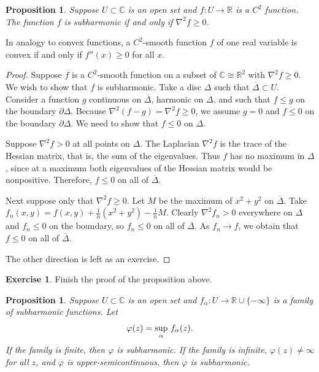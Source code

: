 \documentclass[12pt,openany]{book}
\newcommand{\avoidbreak}{\postdisplaypenalty=100}
\newcommand{\C}{{\mathbb{C}}}
\newcommand{\R}{{\mathbb{R}}}
\theoremstyle{plain}
\newtheorem{prop}[thm]{Proposition}
\theoremstyle{remark}
\theoremstyle{definition}
\newenvironment{exbox}{%
    \def\FrameCommand{\vrule width 1pt \relax\hspace{10pt}}%
    \MakeFramed{\advance\hsize-\width\FrameRestore}%
}{%
    \endMakeFramed
}
\theoremstyle{exercise}
\newtheorem{exercise}{Exercise}[section]
\theoremstyle{example}
\begin{document}
\begin{prop}
Suppose $U \subset \C$ is an open set and $f \colon U \to \R$ is a $C^2$ function.
The function $f$ is subharmonic if and only if
$\nabla^2 f \geq 0$.
\end{prop}

In analogy to convex functions, a $C^2$-smooth function $f$ of one
real variable is convex if and only if $f''(x) \geq 0$ for all $x$.

\begin{proof}
Suppose $f$ is a $C^2$-smooth function on a subset of $\C \cong \R^2$
with $\nabla^2 f \geq 0$.  We wish to show that $f$ is subharmonic.
Take a disc $\Delta$ such that $\overline{\Delta} \subset U$.
Consider a function
$g$ continuous on $\overline{\Delta}$,
harmonic on $\Delta$, and such that
$f \leq g$ on the boundary $\partial \Delta$.  Because
$\nabla^2 (f-g) = \nabla^2 f \geq 0$, we assume $g = 0$ and $f \leq 0$
on the boundary $\partial \Delta$.
We need to show that $f \leq 0$ on $\Delta$.

Suppose $\nabla^2 f > 0$ at all points on $\Delta$.
The Laplacian $\nabla^2 f$ is the trace of the Hessian matrix,
that is, the sum of the eigenvalues.  Thus $f$ has no maximum
in $\Delta$, since at a maximum both eigenvalues of the Hessian matrix
would be nonpositive.
Therefore, $f \leq 0$ on all of $\overline{\Delta}$.

Next suppose only that $\nabla^2 f \geq 0$.
Let $M$ be the maximum of $x^2+y^2$ on $\overline{\Delta}$.
Take $f_n(x,y) = f(x,y) + \frac{1}{n}
( x^2+y^2 ) - \frac{1}{n}M$.  Clearly $\nabla^2 f_n > 0$ everywhere on
$\Delta$ and
$f_n \leq 0$ on the boundary, so $f_n \leq 0$
on all of $\overline{\Delta}$.  As $f_n \to f$, we obtain that
$f \leq 0$ on all of $\overline{\Delta}$.

The other direction is left as an exercise.
\end{proof}

\begin{exbox}
\begin{exercise}
Finish the proof of the proposition above.
\end{exercise}
\end{exbox}

\begin{prop}
\pagebreak[2]%
Suppose $U \subset \C$ is an open set and $f_\alpha \colon U \to \R \cup \{ -\infty \}$
is a family of subharmonic functions.  Let
\begin{equation*}
\varphi(z) = \sup_\alpha\, f_\alpha(z) .
\avoidbreak
\end{equation*}
If the family is finite, then $\varphi$ is subharmonic.
If the family is infinite, $\varphi(z) \not= \infty$ for
all $z$, and $\varphi$
is upper-semicontinuous, then $\varphi$ is subharmonic.
\end{prop}
\end{document}
